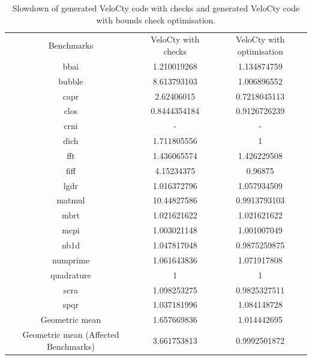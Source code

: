 \begin{table}[htbp]
\centering
\begin{tabular}{|c|c|c|}
\hline
Benchmarks                           & VeloCty with checks & VeloCty with optimisation \\ \hhline{|=|=|=|}
bbai                                 & 1.210019268   & 1.134874759         \\ \hline
bubble                               & 8.613793103   & 1.006896552         \\ \hline
capr                                 & 2.62406015    & 0.7218045113        \\ \hline
clos                                 & 0.8444354184  & 0.9126726239        \\ \hline
crni                                 & -             & -                   \\ \hline
dich                                 & 1.711805556   & 1                   \\ \hline
fft                                  & 1.436065574   & 1.426229508         \\ \hline
fiff                                 & 4.15234375    & 0.96875             \\ \hline
lgdr                                 & 1.016372796   & 1.057934509         \\ \hline
matmul                               & 10.44827586   & 0.9913793103        \\ \hline
mbrt                                 & 1.021621622   & 1.021621622         \\ \hline
mcpi                                 & 1.003021148   & 1.001007049         \\ \hline
nb1d                                 & 1.047817048   & 0.9875259875        \\ \hline
numprime                             & 1.061643836   & 1.071917808         \\ \hline
quadrature                           & 1             & 1                   \\ \hline
scra                                 & 1.098253275   & 0.9825327511        \\ \hline
spqr                                 & 1.037181996   & 1.084148728         \\ \hline
Geometric mean                       & 1.657669836   & 1.014442695         \\ \hline
Geometric mean (Affected Benchmarks) & 3.661753813   & 0.9992501872        \\ \hline
\end{tabular}
\caption{Slowdown of generated VeloCty code with checks and generated VeloCty code with bounds check optimisation. }
\label{tab:CwvsCbc}
\end{table}

